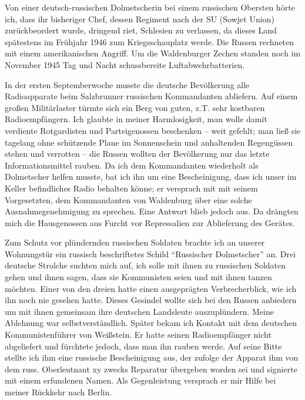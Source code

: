 Von einer deutsch-russischen Dolmetscherin bei einem russischen Obersten hörte ich, dass ihr bisheriger Chef, dessen Regiment nach der SU (Sowjet Union) zurückbeordert wurde,  dringend riet, Schlesien zu verlassen, da dieses Land spätestens im Frühjahr 1946 zum Kriegsschauplatz werde. Die Russen rechneten mit einem amerikanischen Angriff. Um die Waldenburger Zechen standen noch im November 1945 Tag und Nacht schussbereite Luftabwehrbatterien.

 In der ersten Septemberwoche musste die deutsche Bevölkerung alle Radioapparate beim Salzbrunner russischen Kommandanten abliefern. Auf einem großen Militärlaster türmte sich ein Berg von guten, z.T. sehr kostbaren Radioempfängern. Ich glaubte in meiner Harmlosigkeit, man wolle damit verdiente Rotgardisten und Parteigenossen beschenken -- weit gefehlt; man ließ sie tagelang ohne schützende Plane im Sonnenschein und anhaltenden Regengüssen stehen und verrotten -- die Russen wollten der Bevölkerung nur das letzte Informationsmittel rauben. Da ich dem Kommandanten wiederholt als Dolmetscher helfen musste, bat ich ihn um eine Bescheinigung, dass ich unser im Keller befindliches Radio behalten könne; er versprach mit mit seinem Vorgesetzten, dem Kommandanten von Waldenburg über eine solche Ausnahmegenehmigung zu sprechen. Eine Antwort  blieb jedoch aus. Da drängten mich die Hausgenossen aus Furcht vor Repressalien zur Ablieferung des Gerätes.

Zum Schutz vor plündernden russischen Soldaten brachte ich an unserer Wohnungstür ein russisch beschriftetes Schild \enquote{Russischer Dolmetscher} an. Drei deutsche Strolche suchten mich auf, ich solle mit ihnen zu russischen Soldaten gehen und ihnen sagen, dass sie Kommunisten seien und mit ihnen tanzen möchten. Einer von den dreien hatte einen ausgeprägten Verbrecherblick, wie ich ihn noch nie gesehen hatte. Dieses Gesindel wollte sich bei den Russen anbiedern um mit ihnen gemeinsam ihre deutschen Landsleute auszuplündern. Meine Ablehnung war selbstverständlich. Später bekam ich Kontakt mit dem deutschen Kommunistenführer von Weißstein. Er hatte seinen Radioempfänger nicht abgeliefert und fürchtete jedoch, dass man ihn rauben werde. Auf seine Bitte stellte ich ihm eine russische Bescheinigung aus, der zufolge der Apparat ihm von dem russ. Oberleutnant xy zwecks Reparatur übergeben worden sei und signierte mit einem erfundenen Namen. Als Gegenleistung versprach er mir Hilfe bei meiner Rückkehr nach Berlin. 

